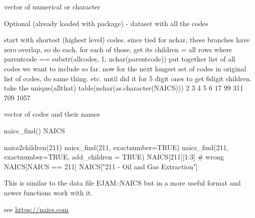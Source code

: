 \documentclass[a4paper]{book}
\begin{document}
%
\begin{Arguments}
\begin{ldescription}
\item[\code{codes}] vector of numerical or character

\item[\code{allcodes}] Optional (already loaded with package) - dataset with all the codes
\end{ldescription}
\end{Arguments}
%
\begin{Details}\relax
start with shortest (highest level) codes. since tied for nchar, these branches have zero overlap, so do each.
for each of those, get its children = all rows where parentcode == substr(allcodes, 1, nchar(parentcode))
put together list of all codes we want to include so far.
now for the next longest set of codes in original list of codes,
do same thing.
etc. until did it for 5 digit ones to get 6digit children.
take the unique(allthat)
table(nchar(as.character(NAICS)))
2    3    4    5    6
17   99  311  709 1057
\end{Details}
%
\begin{Value}
vector of codes and their names
\end{Value}
%
\begin{SeeAlso}\relax
naics\_find() NAICS
\end{SeeAlso}
%
\begin{Examples}
\begin{ExampleCode}
  naics2children(211)
  naics_find(211, exactnumber=TRUE)
  naics_find(211, exactnumber=TRUE, add_children = TRUE)
  NAICS[211][1:3] # wrong
  NAICS[NAICS == 211]
  NAICS["211 - Oil and Gas Extraction"]
\end{ExampleCode}
\end{Examples}
%
\begin{Description}\relax
This is similar to the data file EJAM::NAICS but in a more useful format and newer functions work with it.
\end{Description}
%
\begin{Details}\relax
see \url{https://naics.com}
\end{Details}
%
\begin{SeeAlso}\relax
{}     
\end{SeeAlso}
\end{document}
